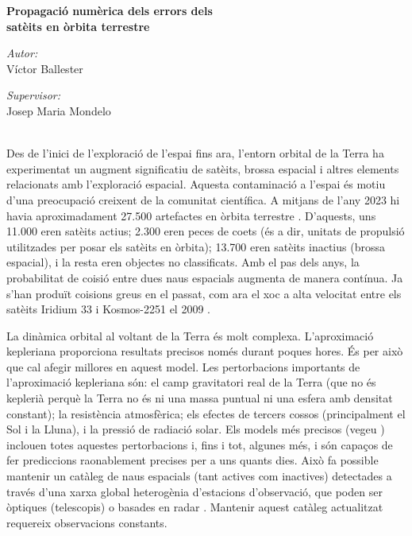 \documentclass{article}
\begin{document}
\begin{center}
  \Large \textbf{Propagació numèrica dels errors dels\\satè\lgem its en òrbita terrestre}
\end{center}
\vspace{0.2cm}
\begin{minipage}[t]{0.49\textwidth}
  \begin{flushleft} \large
    \emph{Autor:}\\[0.1cm]
    Víctor Ballester
  \end{flushleft}
\end{minipage}\hfill
\begin{minipage}[t]{0.49\textwidth}
  \begin{flushright} \large
    \emph{Supervisor:} \\[0.1cm]
    Josep Maria Mondelo
  \end{flushright}
\end{minipage}\\[0.2cm]


Des de l'inici de l'exploració de l'espai fins ara, l'entorn orbital de la Terra ha experimentat un augment significatiu de satè\lgem its, brossa espacial i altres elements relacionats amb l'exploració espacial. Aquesta contaminació a l'espai és motiu d'una preocupació creixent de la comunitat científica. A mitjans de l'any 2023 hi havia aproximadament 27.500 artefactes en òrbita terrestre \cite{web:spacetrack_cat}. D'aquests, uns 11.000 eren satè\lgem its actius; 2.300 eren peces de coets (és a dir, unitats de propulsió utilitzades per posar els satè\lgem its en òrbita); 13.700 eren satè\lgem its inactius (brossa espacial), i la resta eren objectes no classificats. Amb el pas dels anys, la probabilitat de co\lgem isió entre dues naus espacials augmenta de manera contínua. Ja s'han produït co\lgem isions greus en el passat, com ara el xoc a alta velocitat entre els satè\lgem its Iridium 33 i Kosmos-2251 el 2009 \cite{wiki:collision_cat}.

La dinàmica orbital al voltant de la Terra és molt complexa. L'aproximació kepleriana proporciona resultats precisos només durant poques hores. És per això que cal afegir millores en aquest model. Les pertorbacions importants de l'aproximació kepleriana són: el camp gravitatori real de la Terra (que no és keplerià perquè la Terra no és ni una massa puntual ni una esfera amb densitat constant); la resistència atmosfèrica; els efectes de tercers cossos (principalment el Sol i la Lluna), i la pressió de radiació solar. Els models més precisos (vegeu \cite{sgp4OrbitDet_cat}) inclouen totes aquestes pertorbacions i, fins i tot, algunes més, i són capaços de fer prediccions raonablement precises per a uns quants dies. Això fa possible mantenir un catàleg de naus espacials (tant actives com inactives) detectades a través d'una xarxa global heterogènia d'estacions d'observació, que poden ser òptiques (telescopis) o basades en radar \cite{web:spacetrack_cat,web:celestrak_cat}. Mantenir aquest catàleg actualitzat requereix observacions constants.
\end{document}
